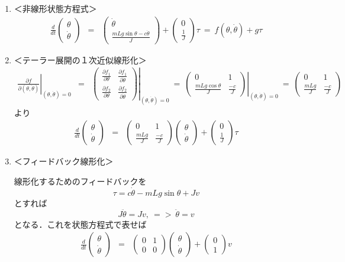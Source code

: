 \documentclass[a4paper,11pt]{jreport}
\renewcommand{\bmatrix}{\left(\begin{array}}
\newcommand{\ematrix}{\end{array}\right)}
\begin{document}
\begin{enumerate}
\item 
＜非線形状態方程式＞
\begin{eqnarray*}
	\frac{d}{dt}
	\bmatrix{c}
		\theta \\
		\dot{\theta}
	\ematrix
	& = &
	\bmatrix{c}
		\dot{\theta} \\
		\frac{mLg \sin \theta -c \dot{\theta}}{J}
	\ematrix
	+
	\bmatrix{c}
		0 \\
		\frac{1}{J}
	\ematrix
	\tau 
	\ = \ 
	f(\theta, \dot{\theta}) + g \tau
\end{eqnarray*}
\item
＜テーラー展開の１次近似線形化＞
\begin{eqnarray*}
	\left .
	\frac{\partial f}{\partial (\theta, \dot{\theta})}
	\right \vert _{(\theta,\dot{\theta})=0} 
	& = & 
	\left .
	\bmatrix{cc}
		\frac{\partial f_1}{\partial \theta} &
		  \frac{\partial f_1}{\partial \dot{\theta}} \\
		\frac{\partial f_2}{\partial \theta} &
		  \frac{\partial f_2}{\partial \dot{\theta}}
	\ematrix
	\right \vert_{(\theta,\dot{\theta})=0} 
	\ = \ 
	\left .
	\bmatrix{cc}
		0 & 1 \\
		\frac{mLg \cos \theta}{J} &
		  \frac{-c}{J}
	\ematrix
	\right \vert_{(\theta,\dot{\theta})=0} 
	\ = \ 
	\bmatrix{cc}
		0 & 1 \\
		\frac{mLg}{J} &
		  \frac{-c}{J}
	\ematrix
\end{eqnarray*}
より
\begin{eqnarray*}
	\frac{d}{dt}
	\bmatrix{c}
		\theta \\
		\dot{\theta}
	\ematrix
	& = &
	\bmatrix{cc}
		0 & 1 \\
		\frac{mLg}{J} &
		  \frac{-c}{J}
	\ematrix
	\bmatrix{c}
		\theta \\
		\dot{\theta}
	\ematrix
	+
	\bmatrix{c}
		0 \\
		\frac{1}{J}
	\ematrix
	\tau
\end{eqnarray*}
\item
＜フィードバック線形化＞

線形化するためのフィードバックを
\[
	\tau = c \dot{\theta} - mLg \sin \theta + J v
\]
とすれば
\[
	J \ddot{\theta} = Jv, \ => \ \ddot{\theta}=v
\]
となる．これを状態方程式で表せば
\begin{eqnarray*}
	\frac{d}{dt}
	\bmatrix{c}
		\theta \\
		\dot{\theta}
	\ematrix
	& = &
	\bmatrix{cc}
		0 & 1 \\
		0 & 0
	\ematrix
	\bmatrix{c}
		\theta \\
		\dot{\theta}
	\ematrix
	+
	\bmatrix{c}
		0 \\
		1
	\ematrix
	v
\end{eqnarray*}

\end{enumerate}
\end{document}
